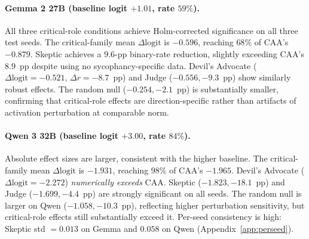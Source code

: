 \documentclass{article}
\theoremstyle{plain}
\theoremstyle{definition}
\theoremstyle{remark}
\begin{document}
\paragraph{Gemma 2 27B (baseline logit $+1.01$, rate $59\%$).}
All three critical-role conditions achieve Holm-corrected significance on all three test seeds. The critical-family mean $\Delta\mathrm{logit}$ is $-0.596$, reaching $68\%$ of CAA's $-0.879$. Skeptic achieves a $9.6$-pp binary-rate reduction, slightly exceeding CAA's $8.9$~pp despite using no sycophancy-specific data. Devil's Advocate ($\Delta\mathrm{logit}=-0.521$, $\Delta r = -8.7$~pp) and Judge ($-0.556, -9.3$~pp) show similarly robust effects. The random null ($-0.254, -2.1$~pp) is substantially smaller, confirming that critical-role effects are direction-specific rather than artifacts of activation perturbation at comparable norm.

\paragraph{Qwen 3 32B (baseline logit $+3.00$, rate $84\%$).}
Absolute effect sizes are larger, consistent with the higher baseline. The critical-family mean $\Delta\mathrm{logit}$ is $-1.931$, reaching $98\%$ of CAA's $-1.965$. Devil's Advocate ($\Delta\mathrm{logit}=-2.272$) \emph{numerically exceeds} CAA. Skeptic ($-1.823, -18.1$~pp) and Judge ($-1.699, -4.4$~pp) are strongly significant on all seeds. The random null is larger on Qwen ($-1.058, -10.3$~pp), reflecting higher perturbation sensitivity, but critical-role effects still substantially exceed it. Per-seed consistency is high: Skeptic std $=0.013$ on Gemma and $0.058$ on Qwen (Appendix~\ref{app:perseed}).
\end{document}
